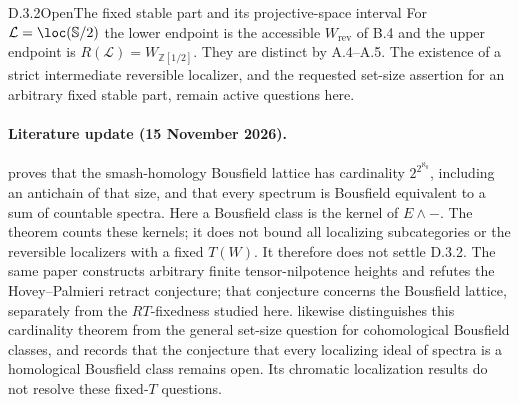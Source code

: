 \begin{claim}{D.3.2}{Open}{The fixed stable part and its projective-space interval}
For $\mathcal L=\loc(\mathbb S/2)$ the lower endpoint is the accessible $W_{\mathrm{rev}}$ of B.4 and the upper endpoint is $R(\mathcal L)=W_{\mathbb Z[1/2]}$. They are distinct by A.4--A.5. The existence of a strict intermediate reversible localizer, and the requested set-size assertion for an arbitrary fixed stable part, remain active questions here.
\end{claim}

\paragraph{Literature update (15 November 2026).}
\citet[Theorem~1.4]{EH5Putzstuck2026} proves that the smash-homology
Bousfield lattice has cardinality $2^{2^{\aleph_0}}$, including an antichain
of that size, and that every spectrum is Bousfield equivalent to a sum of
countable spectra. Here a Bousfield class is the kernel of $E\wedge-$.
The theorem counts these kernels; it does not bound all localizing
subcategories or the reversible localizers with a fixed $T(W)$.
It therefore does not settle D.3.2. The same paper constructs arbitrary
finite tensor-nilpotence heights and refutes the Hovey--Palmieri retract
conjecture; that conjecture concerns the Bousfield lattice, separately
from the $RT$-fixedness studied here.
\citet[Remarks~2.3, 2.9 and 2.10]{EH5BCHSZ2026} likewise distinguishes
this cardinality theorem from the general set-size question for
cohomological Bousfield classes, and records that the conjecture that
every localizing ideal of spectra is a homological Bousfield class
remains open. Its chromatic localization results do not resolve these
fixed-$T$ questions.







